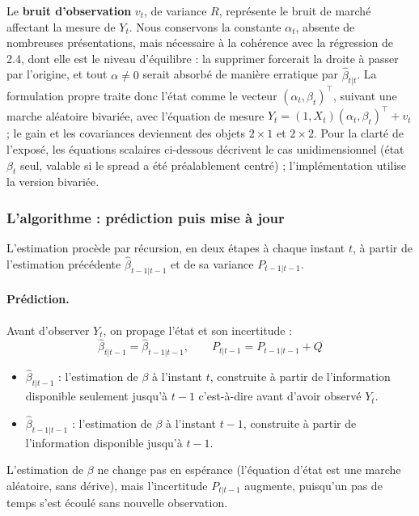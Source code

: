 \documentclass{article}
\begin{document}
Le \textbf{bruit d'observation} $v_t$, de variance $R$, représente le bruit de marché affectant la mesure de $Y_t$. Nous conservons la constante $\alpha_t$, absente de nombreuses présentations, mais nécessaire à la cohérence avec la régression de 2.4, dont elle est le niveau d'équilibre : la supprimer forcerait la droite à passer par l'origine, et tout $\alpha\neq 0$ serait absorbé de manière erratique par $\hat\beta_{t|t}$. La formulation propre traite donc l'état comme le vecteur $(\alpha_t,\beta_t)^\top$, suivant une marche aléatoire bivariée, avec l'équation de mesure $Y_t=(1,X_t)(\alpha_t,\beta_t)^\top+v_t$ ; le gain et les covariances deviennent des objets $2\times 1$ et $2\times 2$. Pour la clarté de l'exposé, les équations scalaires ci-dessous décrivent le cas unidimensionnel (état $\beta_t$ seul, valable si le spread a été préalablement centré) ; l'implémentation utilise la version bivariée.
\subsubsection*{L'algorithme : prédiction puis mise à jour}
L'estimation procède par récursion, en deux étapes à chaque instant $t$, à partir de l'estimation précédente $\hat\beta_{t-1|t-1}$ et de sa variance $P_{t-1|t-1}$.
\paragraph{Prédiction.} Avant d'observer $Y_t$, on propage l'état et son incertitude :
\begin{equation}
\hat\beta_{t|t-1} = \hat\beta_{t-1|t-1}, \qquad P_{t|t-1} = P_{t-1|t-1} + Q
\end{equation}
\begin{itemize}
\item $\hat\beta_{t|t-1}$ : l'estimation de $\beta$ à l'instant $t$, construite à partir de l'information disponible seulement jusqu'à $t-1$ c'est-à-dire avant d'avoir observé $Y_t$.
\item $\hat\beta_{t-1|t-1}$ : l'estimation de $\beta$ à l'instant $t-1$, construite à partir de l'information disponible jusqu'à $t-1$.
\end{itemize}
L'estimation de $\beta$ ne change pas en espérance (l'équation d'état est une marche aléatoire, sans dérive), mais l'incertitude $P_{t|t-1}$ augmente, puisqu'un pas de temps s'est écoulé sans nouvelle observation.
\end{document}
